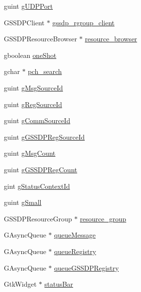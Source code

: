 \begin{DoxyCompactItemize}
\item 
guint \hyperlink{struct__control_data_a78b36762a9d85d027fc5e41576ade4f7}{g\+U\+D\+P\+Port}
\item 
G\+S\+S\+D\+P\+Client $\ast$ \hyperlink{struct__control_data_a05dec2c5c598d299306a41430093b6de}{gssdp\+\_\+rgroup\+\_\+client}
\item 
G\+S\+S\+D\+P\+Resource\+Browser $\ast$ \hyperlink{struct__control_data_a796910b4ad0830538301efd69811c2c6}{resource\+\_\+browser}
\item 
gboolean \hyperlink{struct__control_data_a772b5b4e4d92eee73100445963cbe682}{one\+Shot}
\item 
gchar $\ast$ \hyperlink{struct__control_data_aae1d10aba11260e77341d9f5fa6055e2}{pch\+\_\+search}
\item 
guint \hyperlink{struct__control_data_a4be65550b087ca645572b8ebc726250d}{g\+Msg\+Source\+Id}
\item 
guint \hyperlink{struct__control_data_a96ccde7cdcba6f4f52f472f95ddaf782}{g\+Reg\+Source\+Id}
\item 
guint \hyperlink{struct__control_data_a599cefa2edf28b0cf58f9180a3be0a19}{g\+Comm\+Source\+Id}
\item 
guint \hyperlink{struct__control_data_a4132cf34364874408e8b15be539e654d}{g\+G\+S\+S\+D\+P\+Reg\+Source\+Id}
\item 
guint \hyperlink{struct__control_data_ae797898f8e5ad5c3128da674f86520d1}{g\+Msg\+Count}
\item 
guint \hyperlink{struct__control_data_a841eb51dde0376a7540a23e65933e822}{g\+G\+S\+S\+D\+P\+Reg\+Count}
\item 
gint \hyperlink{struct__control_data_aae36ce9466663c5765139bb92e9f8d49}{g\+Status\+Context\+Id}
\item 
guint \hyperlink{struct__control_data_aa53ce6d64a23cb93cc0c98e0835b6449}{g\+Small}
\item 
G\+S\+S\+D\+P\+Resource\+Group $\ast$ \hyperlink{struct__control_data_ab8684a42dc1f2e00247d7278d47046b9}{resource\+\_\+group}
\item 
G\+Async\+Queue $\ast$ \hyperlink{struct__control_data_adc74ddf3f6a7535eee87d39ed80ee7dd}{queue\+Message}
\item 
G\+Async\+Queue $\ast$ \hyperlink{struct__control_data_a09b9467cd00be5a9ecac2386429ab65a}{queue\+Registry}
\item 
G\+Async\+Queue $\ast$ \hyperlink{struct__control_data_ad4c1f099018b51b0faeae870d284819d}{queue\+G\+S\+S\+D\+P\+Registry}
\item 
Gtk\+Widget $\ast$ \hyperlink{struct__control_data_a661ed960369e640e5f56da1abe7c2168}{status\+Bar}

\end{DoxyCompactItemize}
